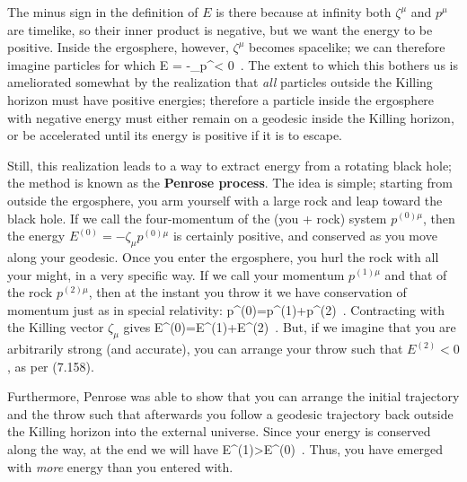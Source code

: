 The minus sign in the definition of $E$ is there because at infinity both
$\zeta^\mu$ and $p^\mu$ are timelike, so their inner product is negative,
but we want the energy to be positive.  Inside the ergosphere, however,
$\zeta^\mu$ becomes spacelike; we can therefore imagine particles for
which
\be
  E = -\zeta_\mu p^\mu < 0\ .\label{7.138}
\ee
The extent to which this bothers us is ameliorated somewhat by the
realization that {\it all} particles outside the Killing horizon
must have positive energies; therefore a particle inside the
ergosphere with negative energy must either remain on a geodesic
inside the Killing horizon, or be accelerated until its energy is
positive if it is to escape.

Still, this realization leads to a way to extract energy from a 
rotating black hole; the method is known as the {\bf Penrose process}.
The idea is simple; starting from outside the ergosphere, you arm
yourself with a large rock and leap toward the black hole.  If we
call the four-momentum of the (you + rock) system $p^{(0)\mu}$, then
the energy $E^{(0)}=-\zeta_\mu p^{(0)\mu}$ is certainly positive,
and conserved as you move along your geodesic.  Once you enter the
ergosphere, you hurl the rock with all your might, in a very
specific way.  If we call your momentum $p^{(1)\mu}$ and that of
the rock $p^{(2)\mu}$, then at the instant you throw it we have
conservation of momentum just as in special relativity:
\be
  p^{(0)\mu}=p^{(1)\mu}+p^{(2)\mu}\ .\label{7.139}
\ee
Contracting with the Killing vector $\zeta_\mu$ gives
\be
  E^{(0)}=E^{(1)}+E^{(2)}\ .\label{7.140}
\ee
But, if we imagine that you are arbitrarily strong (and accurate),
you can arrange your throw such that $E^{(2)}<0$, as per (7.158).
\begin{figure}
  \centerline{
  }
\end{figure}
Furthermore, Penrose was able to show that you can arrange the
initial trajectory and the throw such that afterwards you follow a
geodesic trajectory back outside the Killing horizon into the
external universe.  Since your energy is conserved along the way,
at the end we will have
\be
  E^{(1)}>E^{(0)}\ .\label{7.141}
\ee
Thus, you have emerged with {\it more} energy than you entered
with.

